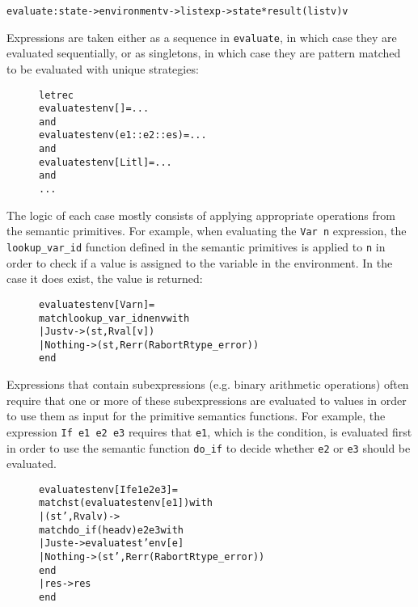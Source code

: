 \begin{alltt}
evaluate:state -> environment v -> list exp -> state * result (list v) v
\end{alltt}

\noindent Expressions are taken either as a sequence in \texttt{evaluate},
in which case they are evaluated sequentially, or as singletons, in which case
they are pattern matched to be evaluated with unique strategies:

\begin{figure}[H]
\begin{alltt}
  let rec
  evaluate st env []           = ...
  and
  evaluate st env (e1::e2::es) = ...
  and
  evaluate st env [Lit l]      = ...
  and
  ...
\end{alltt}
\end{figure}

\noindent The logic of each case mostly consists of applying appropriate
operations from the semantic primitives. For example, when evaluating
the \texttt{Var n} expression, the \texttt{lookup\_var\_id} function defined
in the semantic primitives is applied to \texttt{n} in order to check if
a value is assigned to the variable in the environment. In the case it does
exist, the value is returned:

\begin{figure}[H]
\begin{alltt}
  evaluate st env [Var n] =
    match lookup_var_id n env with
    | Just v -> (st, Rval [v])
    | Nothing -> (st, Rerr (Rabort Rtype_error))
    end
\end{alltt}
\end{figure}

\noindent Expressions that contain subexpressions (e.g. binary arithmetic
operations) often require that one or more of these subexpressions are
evaluated to values in order to use them as input for the primitive semantics
functions. For example, the expression \texttt{If e1 e2 e3} requires that
\texttt{e1}, which is the condition, is evaluated first in order to use the
semantic function \texttt{do\_if} to decide whether \texttt{e2} or
\texttt{e3} should be evaluated.

\begin{figure}[H]
\begin{alltt}
  evaluate st env [If e1 e2 e3] =
    match st (evaluate st env [e1]) with
    | (st', Rval v) ->
        match do_if (head v) e2 e3 with
        | Just e -> evaluate st' env [e]
        | Nothing -> (st', Rerr (Rabort Rtype_error))
        end
    | res -> res
    end
\end{alltt}
\end{figure}

